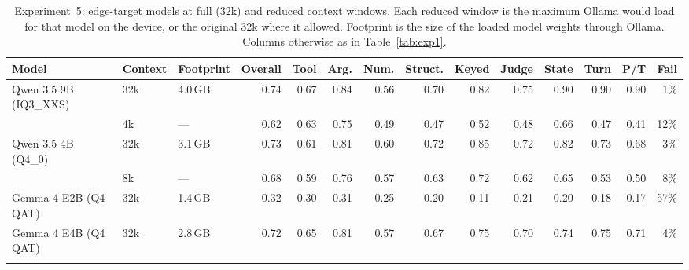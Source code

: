 \begin{table}[!t]
\centering
\caption{Experiment~5: edge-target models at full (32k) and reduced context windows. Each reduced window is the maximum Ollama would load for that model on the device, or the original 32k where it allowed. Footprint is the size of the loaded model weights through Ollama. Columns otherwise as in Table~\ref{tab:exp1}.}
\label{tab:exp4}
\small
\setlength{\tabcolsep}{4pt}
\begin{tabular}{@{}lll rrrrrrrrrrr@{}}
\toprule
Model & Context & Footprint & Overall & Tool & Arg. & Num. & Struct. & Keyed & Judge & State & Turn & P/T & Fail \\
\midrule
Qwen 3.5 9B (IQ3\_XXS) & 32k & 4.0\,GB & 0.74 & 0.67 & 0.84 & 0.56 & 0.70 & 0.82 & 0.75 & 0.90 & 0.90 & 0.90 & 1\% \\
 & 4k & --- & 0.62 & 0.63 & 0.75 & 0.49 & 0.47 & 0.52 & 0.48 & 0.66 & 0.47 & 0.41 & 12\% \\
\addlinespace
Qwen 3.5 4B (Q4\_0) & 32k & 3.1\,GB & 0.73 & 0.61 & 0.81 & 0.60 & 0.72 & 0.85 & 0.72 & 0.82 & 0.73 & 0.68 & 3\% \\
 & 8k & --- & 0.68 & 0.59 & 0.76 & 0.57 & 0.63 & 0.72 & 0.62 & 0.65 & 0.53 & 0.50 & 8\% \\
\addlinespace
Gemma 4 E2B (Q4 QAT) & 32k & 1.4\,GB & 0.32 & 0.30 & 0.31 & 0.25 & 0.20 & 0.11 & 0.21 & 0.20 & 0.18 & 0.17 & 57\% \\
\addlinespace
Gemma 4 E4B (Q4 QAT) & 32k & 2.8\,GB & 0.72 & 0.65 & 0.81 & 0.57 & 0.67 & 0.75 & 0.70 & 0.74 & 0.75 & 0.71 & 4\% \\
\addlinespace
\bottomrule
\end{tabular}
\end{table}
